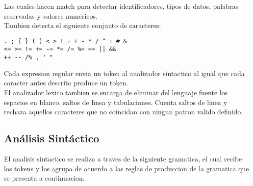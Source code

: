 \documentclass[aspectratio=169]{article}
\begin{document}
Las cuales hacen match para detectar identificadores, tipos de datos, palabras reservadas y
valores numericos.\\

Tambien detecta el siguiente conjunto de caracteres: \\

\begin{lstlisting}
. ; { } ( ) < > ! = + - * / ^ : # &
<= >= != += -= *= /= %= == || &&
++ -- /% , ' "
\end{lstlisting}

Cada expresion regular envia un token al analizador sintactico al igual que cada caracter antes descrito
produce un token.\\

El analizador lexico tambien se encarga de eliminar del lenguaje fuente los espacios en blanco, saltos
de linea y tabulaciones. Cuenta saltos de linea y rechaza aquellos caracteres que no coincidan con ningun
patron valido definido.


\subsection{An\'alisis Sint\'actico}

El analisis sintactico se realiza a traves de la siguiente gramatica, el cual recibe los tokens
y los agrupa de acuerdo a las reglas de produccion de la gramatica que se presenta a continuacion.
\end{document}
